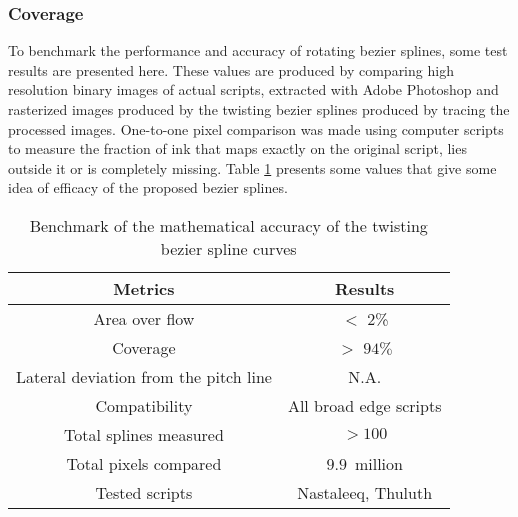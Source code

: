 \subsubsection{Coverage}
To benchmark the performance and accuracy  of rotating bezier splines, some test results are presented here. These values are produced by comparing high resolution binary images of actual scripts, extracted with Adobe Photoshop and rasterized images produced by the twisting bezier splines produced by tracing the processed images. One-to-one pixel comparison was made using computer scripts to measure the fraction of ink that maps exactly on the original script, lies outside it or is completely missing. Table \ref{Table:Accuracy} presents some values that give some idea of efficacy of the proposed bezier splines.

\begin{table}
\begin{center}
\caption{Benchmark of the mathematical accuracy of the twisting bezier spline curves}
\label{Table:Accuracy}
\begin{tabular}{| c | c |}
  \hline
\textbf{Metrics} & \textbf{Results} \\
  \hline
Area over flow & $<$ 2\% \\
  \hline
Coverage & $>$ $94\%$ \\
  \hline
Lateral deviation from the pitch line & N.A. \\
  \hline
Compatibility & All broad edge scripts \\
  \hline
Total splines measured & $>100$ \\
  \hline
Total pixels compared & $9.9$~million \\
  \hline
Tested scripts & Nastaleeq, Thuluth \\
\hline
\end{tabular}
\end{center}
\end{table}
%
%
